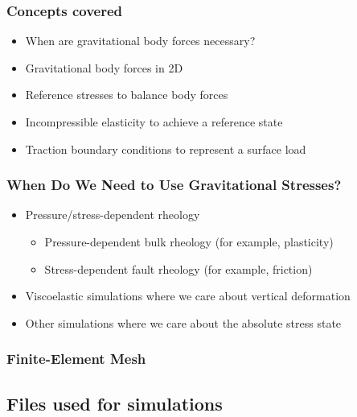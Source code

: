 \documentclass[aspectratio=169]{beamer}
\begin{document}
\begin{frame}
  \frametitle{Concepts covered}
  \summary{}

  \begin{itemize}
  \item When are gravitational body forces necessary?
  \item Gravitational body forces in 2D
  \item Reference stresses to balance body forces
  \item Incompressible elasticity to achieve a reference state
  \item Traction boundary conditions to represent a surface load
  \end{itemize}
  
\end{frame}


\begin{frame}
  \frametitle{When Do We Need to Use Gravitational Stresses?}
  \summary{}

  \begin{itemize}
  \item Pressure/stress-dependent rheology
    \begin{itemize}
    \item Pressure-dependent bulk rheology (for example, plasticity)
    \item Stress-dependent fault rheology (for example, friction)
    \end{itemize}
  \item Viscoelastic simulations where we care about vertical deformation
  \item Other simulations where we care about the absolute stress state
  \end{itemize}
  
\end{frame}


\begin{frame}
  \frametitle{Finite-Element Mesh}

  
\end{frame}


\subsection{Files used for simulations}
\end{document}
